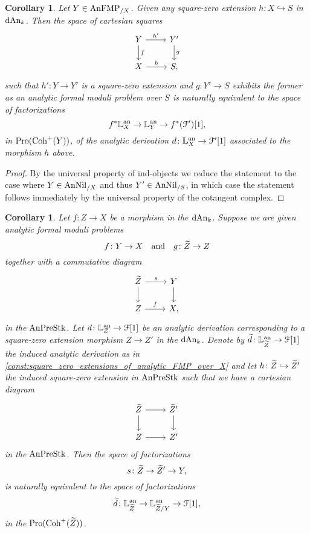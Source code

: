 \documentclass[10pt,a4paper,reqno]{amsart} %
\theoremstyle{plain}
\newtheorem{cor}[thm]{Corollary}
\theoremstyle{definition}
\theoremstyle{remark}
\numberwithin{equation}{section}
\begin{document}
\begin{cor} \label{cor:construction_of_square_zero_extensions_for_analytic_FMP_using_univ_property_of_cotangent_complex}
    Let $Y \in \mathrm{AnFMP}_{/X}$. Given any square-zero extension $h \colon X \hookrightarrow S$ in $\mathrm{dAn}_k$. Then the space of cartesian squares
        \[
        \begin{tikzcd}
            Y \ar{r}{h'} \ar{d}{f} & Y' \ar{d}{g} \\
            X \ar{r}{h} & S,
        \end{tikzcd}
        \]
    such that $h' \colon Y \to Y'$ is a square-zero extension and $g \colon Y' \to S$ exhibits the former
    as an analytic formal moduli problem over $S$ is naturally equivalent to the space of factorizations
        \[
            f^* \mathbb L^\mathrm{an}_X \to \mathbb L^\mathrm{an}_Y \to f^*( \mathcal F')[1],
        \]
    in $\mathrm{Pro}(\mathrm{Coh}^+(Y))$, of the analytic derivation $d \colon \mathbb L^\mathrm{an}_X \to \mathcal F'[1]$ associated to the morphism $h$ above.
\end{cor}

\begin{proof}
    By the universal property of ind-objects we reduce the statement to the case where $Y \in \mathrm{AnNil}_{/X}$ and thus $Y' \in \mathrm{AnNil}_{/S}$, in which
    case the statement follows immediately by the universal property of the cotangent complex. 
\end{proof}

\begin{cor} \label{cor:universal_property_of_relative_cotangent_complex_for_morphisms_between_analytic_FMP}
    Let $f \colon Z \to X$ be a morphism in the \infcat $\mathrm{dAn}_k$. Suppose we are given analytic formal moduli problems
        \[
            f \colon Y \to X \quad \mathrm{and} \quad g \colon \widetilde Z \to Z
        \]
    together with a commutative diagram
        \[
        \begin{tikzcd}
            \tZ \ar{r}{s} \ar{d} & Y \ar{d} \\
            Z \ar{r}{f} & X,  
        \end{tikzcd}
        \]
    in the \infcat $\mathrm{AnPreStk}$. Let $d \colon \mathbb L^\mathrm{an}_Z \to \mathcal F[1]$ be an analytic derivation corresponding to a square-zero extension morphism
    $Z \to Z'$ in the \infcat $\mathrm{dAn}_k$. Denote by
    $\widetilde{d} \colon \mathbb L^\mathrm{an}_{\widetilde Z} \to \mathcal F[1]$ the induced analytic derivation as in \cref{const:square_zero_extensions_of_analytic_FMP_over_X}
    and let $h \colon \widetilde Z \hookrightarrow \widetilde Z'$ the induced square-zero extension in $\mathrm{AnPreStk}$ such that we have a cartesian diagram
        \[
        \begin{tikzcd}
            \tZ \ar{r} \ar{d} & \tZ' \ar{d} \\
            Z \ar{r} & Z'  
        \end{tikzcd}
        \]
    in the \infcat $\mathrm{AnPreStk}$. Then the space of factorizations
        \[
            s \colon \widetilde Z \to \widetilde Z' \to Y,  
        \]
    is naturally equivalent to the space of factorizations
        \[
            \widetilde{d} \colon \mathbb L^\mathrm{an}_{\widetilde Z} \to  \mathbb L^\mathrm{an}_{\widetilde Z/ Y} \to \mathcal F[1]  ,
        \]
    in the \infcat $\mathrm{Pro}(\mathrm{Coh}^+(\widetilde Z))$.
\end{cor}
\end{document}

